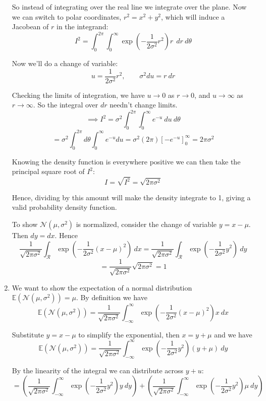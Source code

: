 \documentclass[../main.tex]{subfiles}
\begin{document}
\begin{enumerate}
So instead of integrating over the real line we integrate over the plane. Now we can switch to polar coordinates, $r^2 = x^2 + y^2$, which will induce a Jacobean of $r$ in the integrand:
$$I^2 = \int_{0}^{2\pi}\int_0^\infty \exp\left(-\frac{1}{2\sigma^2}r^2\right) r \ \ dr \ d\theta$$

Now we'll do a change of variable:
$$u = \frac{1}{2\sigma^2}r^2, \qquad \sigma^2 du = r \ dr$$

Checking the limits of integration, we have $u \rightarrow 0$ as $r \rightarrow 0 $, and $u \rightarrow \infty$ as $r \rightarrow \infty$. So the integral over $dr$ needn't change limits.
$$\implies I^2 = \sigma^2 \int_0^{2\pi}\int_0^\infty e^{-u} \ du \ d\theta$$
$$= \sigma^2 \int_0^{2\pi}d\theta \int_0^\infty e^{-u} du = \sigma^2 (2\pi)\left[-e^{-u}\right]^\infty_0 = 2\pi \sigma^2$$

Knowing the density function is everywhere positive we can then take the principal square root of $I^2$:
$$I = \sqrt{I^2} = \sqrt{2\pi \sigma^2}$$

Hence, dividing by this amount will make the density integrate to 1, giving a valid probability density function.

To show $\mathcal{N}(\mu, \sigma^2)$ is normalized, consider the change of variable $y = x - \mu$. Then $dy = dx$. Hence 
$$\frac{1}{\sqrt{2\pi\sigma^2}}\int_\mathcal{R} \exp(-\frac{1}{2\sigma^2}(x - \mu)^2 )\ dx = \frac{1}{\sqrt{2\pi\sigma^2}}\int_\mathcal{R} \exp(-\frac{1}{2\sigma^2}y^2) \ dy$$
$$ = \frac{1}{\sqrt{2\pi \sigma^2}}\sqrt{2\pi\sigma^2} = 1$$

\item We want to show the expectation of a normal distribution $\mathbb{E}(\mathcal{N}(\mu, \sigma^2) ) = \mu$. By definition we have
$$\mathbb{E}(\mathcal{N}(\mu, \sigma^2)) = \frac{1}{\sqrt{2\pi\sigma^2}}\int_{-\infty}^{\infty} \exp\left(-\frac{1}{2\sigma^2}(x - \mu)^2\right) x \ dx$$

Substitute $y = x - \mu$ to simplify the exponential, then $x = y + \mu$ and we have
$$\mathbb{E}(\mathcal{N}(\mu, \sigma^2)) = 
\frac{1}{\sqrt{2\pi\sigma^2}}\int_{-\infty}^{\infty} \exp\left(-\frac{1}{2\sigma^2}y^2\right) (y + \mu) \ dy$$

By the linearity of the integral we can distribute across $y + u$:
$$=
\left(\frac{1}{\sqrt{2\pi\sigma^2}}\int_{-\infty}^{\infty} \exp\left(-\frac{1}{2\sigma^2}y^2\right)y  \ dy\right) + \left(\frac{1}{\sqrt{2\pi\sigma^2}}\int_{-\infty}^{\infty} \exp\left(-\frac{1}{2\sigma^2}y^2\right)\mu  \ dy \right)
$$


\end{enumerate}
\end{document}
